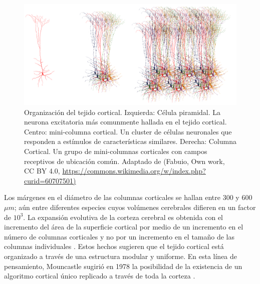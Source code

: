 
\begin{figure}[h!]
    \centering
    \includegraphics[width=1.0\textwidth]{Biological.png}
    \caption{Organización del tejido cortical. Izquierda: Célula piramidal. La neurona excitatoria más comunmente hallada en el tejido cortical.
    Centro: mini-columna cortical. Un cluster de células neuronales que responden a estímulos de características similares.
    Derecha: Columna Cortical. Un grupo de mini-columnas corticales con campos receptivos de ubicación común.
    Adaptado de (Fabuio, Own work, CC BY 4.0, \url{https://commons.wikimedia.org/w/index.php?curid=60707501)}}
    \label{fig:Biological}
\end{figure}

Los márgenes en el diámetro de las columnas corticales se hallan entre 300 y 600 $\mu m$; aún entre diferentes especies cuyos volúmenes cerebrales difieren en un factor de $10^3$. La expansión evolutiva de la corteza cerebral es obtenida con el incremento del área de la superficie cortical por medio de un incremento en el número de columnas corticales y no por un incremento en el tamaño de las columnas individuales \cite{rakic_1995}. Estos hechos sugieren que el tejido cortical está organizado a través de una estructura modular y uniforme. En esta línea de pensamiento, Mouncastle sugirió en 1978 la posibilidad de la existencia de un algoritmo cortical único replicado a través de toda la corteza \cite{mountcastle_1978}.

